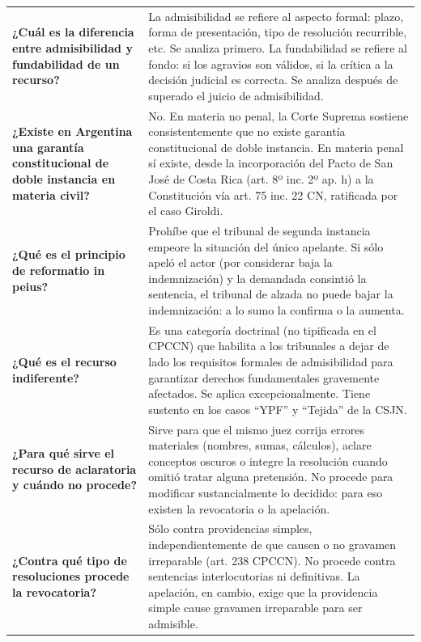 \documentclass[12pt,oneside]{book}
\begin{document}
\begin{table}[H]
\begin{tabularx}{\textwidth}{
    >{\raggedright\arraybackslash}p{}
    >{\raggedright\arraybackslash}X
}
\textbf{¿Cuál es la diferencia entre admisibilidad y fundabilidad de un recurso?} & La admisibilidad se refiere al aspecto formal: plazo, forma de presentación, tipo de resolución recurrible, etc. Se analiza primero. La fundabilidad se refiere al fondo: si los agravios son válidos, si la crítica a la decisión judicial es correcta. Se analiza después de superado el juicio de admisibilidad. \\

\textbf{¿Existe en Argentina una garantía constitucional de doble instancia en materia civil?} & No. En materia no penal, la Corte Suprema sostiene consistentemente que no existe garantía constitucional de doble instancia. En materia penal sí existe, desde la incorporación del Pacto de San José de Costa Rica (art. 8º inc. 2º ap. h) a la Constitución vía art. 75 inc. 22 CN, ratificada por el caso Giroldi. \\

\textbf{¿Qué es el principio de reformatio in peius?} & Prohíbe que el tribunal de segunda instancia empeore la situación del único apelante. Si sólo apeló el actor (por considerar baja la indemnización) y la demandada consintió la sentencia, el tribunal de alzada no puede bajar la indemnización: a lo sumo la confirma o la aumenta. \\

\textbf{¿Qué es el recurso indiferente?} & Es una categoría doctrinal (no tipificada en el CPCCN) que habilita a los tribunales a dejar de lado los requisitos formales de admisibilidad para garantizar derechos fundamentales gravemente afectados. Se aplica excepcionalmente. Tiene sustento en los casos ``YPF'' y ``Tejida'' de la CSJN. \\

\textbf{¿Para qué sirve el recurso de aclaratoria y cuándo no procede?} & Sirve para que el mismo juez corrija errores materiales (nombres, sumas, cálculos), aclare conceptos oscuros o integre la resolución cuando omitió tratar alguna pretensión. No procede para modificar sustancialmente lo decidido: para eso existen la revocatoria o la apelación. \\

\textbf{¿Contra qué tipo de resoluciones procede la revocatoria?} & Sólo contra providencias simples, independientemente de que causen o no gravamen irreparable (art. 238 CPCCN). No procede contra sentencias interlocutorias ni definitivas. La apelación, en cambio, exige que la providencia simple cause gravamen irreparable para ser admisible. \\


\end{tabularx}
\end{table}
\end{document}
